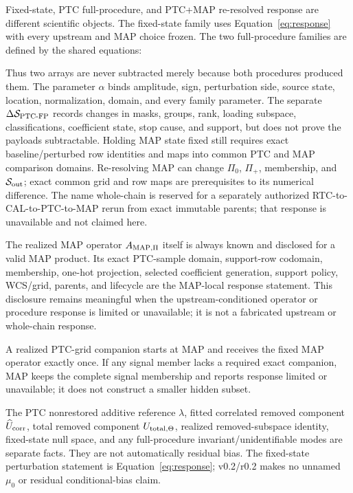 \documentclass[10pt]{article}
\begin{document}
Fixed-state, PTC full-procedure, and PTC+MAP re-resolved response are different
scientific objects. The fixed-state family uses Equation~\eqref{eq:response}
with every upstream and MAP choice frozen. The two full-procedure families are
defined by the shared equations:

\SCIMapProcedureResponseEquations

\SCIMapComparisonSpaceDefinition

Thus two arrays are never subtracted merely because both procedures produced
them. The parameter \(\alpha\) binds amplitude, sign, perturbation side,
source state, location, normalization, domain, and every family parameter.
The separate \(\Delta\mathcal S_{{\rm PTC}\text{-}{\rm FP}}\) records changes
in masks, groups, rank, loading subspace, classifications, coefficient state,
stop cause, and support, but does not prove the payloads subtractable. Holding
MAP state fixed still requires exact baseline/perturbed row identities and
maps into common PTC and MAP comparison domains. Re-resolving MAP can change
\(\Pi_0\), \(\Pi_+\), membership, and \(\mathcal S_{\rm out}\); exact common
grid and row maps are prerequisites to its numerical difference. The name
whole-chain is reserved for a separately authorized RTC-to-CAL-to-PTC-to-MAP
rerun from exact immutable parents; that response is unavailable and not
claimed here.

The realized MAP operator \(A_{{\rm MAP},\Pi}\) itself is always known and
disclosed for a valid MAP product. Its exact PTC-sample domain, support-row
codomain, membership, one-hot projection, selected coefficient generation,
support policy, WCS/grid, parents, and lifecycle are the MAP-local response
statement. This disclosure remains meaningful when the upstream-conditioned
operator or procedure response is limited or unavailable; it is not a
fabricated upstream or whole-chain response.

A realized PTC-grid companion starts at MAP and receives the fixed MAP
operator exactly once. If any signal member lacks a required exact companion,
MAP keeps the complete signal membership and reports response limited or
unavailable; it does not construct a smaller hidden subset.

The PTC nonrestored additive reference \(\lambda\), fitted correlated removed
component \(\widehat U_{\rm corr}\), total removed component
\(U_{{\rm total},\Theta}\), realized removed-subspace identity, fixed-state
null space, and any full-procedure invariant/unidentifiable modes are separate
facts. They are not automatically residual bias. The fixed-state perturbation
statement is Equation~\eqref{eq:response}; v0.2/r0.2 makes no unnamed \(\mu_0\) or
residual conditional-bias claim.
\end{document}
